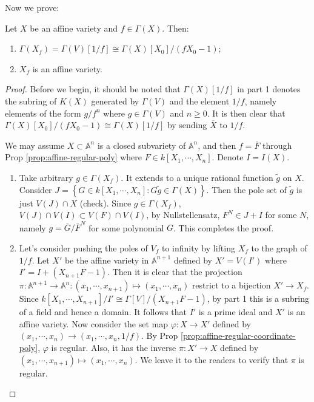 \documentclass{note-eng}
\begin{document}
Now we prove:

\begin{proposition}
    Let $X$ be an affine variety and $f \in \Gamma(X)$. Then:
    \begin{enumerate}
        \item $\Gamma(X_f) = \Gamma(V)[1 / f] \cong \Gamma(X)[X_0] / (fX_0 - 1)$;
        \item $X_f$ is an affine variety.
    \end{enumerate}
\end{proposition}

\begin{proof}
    Before we begin, it should be noted that $\Gamma(X)[1 / f]$ in part 1 denotes the subring of $K(X)$ generated by $\Gamma(V)$ and the element $1 / f$, namely elements of the form $g / f^n$ where $g \in \Gamma(V)$ and $n \ge 0$. It is then clear that $\Gamma(X)[X_0] / (fX_0 - 1) \cong \Gamma(X)[1 / f]$ by sending $\overline{X}$ to $1 / f$.

    We may assume $X \subset \mathbb{A}^n$ is a closed subvariety of $\mathbb{A}^n$, and then $f = \overline{F}$ through Prop \ref{prop:affine-regular-poly} where $F \in k[X_1, \cdots, X_n]$. Denote $I = I(X)$.

    \begin{enumerate}
        \item Take arbitrary $g \in \Gamma(X_f)$. It extends to a unique rational function $\tilde{g}$ on $X$. Consider $J = \left\lbrace G \in k[X_1, \cdots, X_n]: G \tilde{g} \in \Gamma(X) \right\rbrace$. Then the pole set of $\tilde{g}$ is just $V(J) \cap X$ (check). Since $g \in \Gamma(X_f)$, $V(J) \cap V(I) \subset V(F) \cap V(I)$, by Nullstellensatz, $F^N \in J + I$ for some $N$, namely $g = \overline{G} / \overline{F}^N$ for some polynomial $G$. This completes the proof.
        \item Let's consider pushing the poles of $V_f$ to infinity by lifting $X_f$ to the graph of $1 / f$. Let $X'$ be the affine variety in $\mathbb{A}^{n + 1}$ defined by $X' = V(I')$ where $I' = I + (X_{n + 1}F - 1)$. Then it is clear that the projection $\pi: \mathbb{A}^{n + 1} \rightarrow \mathbb{A}^n: (x_1, \cdots, x_{n + 1}) \mapsto (x_1, \cdots, x_n)$ restrict to a bijection $X' \rightarrow X_f$. Since $k[X_1, \cdots, X_{n + 1}] / I' \cong \Gamma[V] / (X_{n + 1}F - 1)$, by part 1 this is a subring of a field and hence a domain. It follows that $I'$ is a prime ideal and $X'$ is an affine variety. Now consider the set map $\varphi: X \rightarrow X'$ defined by $(x_1, \cdots, x_n) \rightarrow (x_1, \cdots, x_n, 1 / f)$. By Prop \ref{prop:affine-regular-coordinate-poly}, $\varphi$ is regular. Also, it has the inverse $\pi: X' \rightarrow X$ defined by $(x_1, \cdots, x_{n + 1}) \mapsto (x_1, \cdots, x_n)$. We leave it to the readers to verify that $\pi$ is regular.
    \end{enumerate}
\end{proof}
\end{document}
